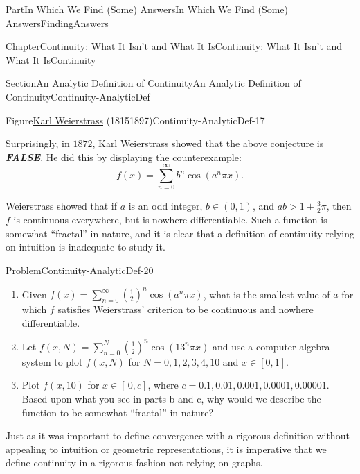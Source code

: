 \documentclass[oneside,10pt,]{book}
\newcommand{\alert}[1]{\textbf{\textit{#1}}}
\numberwithin{equation}{part}
\begin{document}
\begin{partptx}{Part}{In Which We Find (Some) Answers}{}{In Which We Find (Some) Answers}{}{}{FindingAnswers}
\begin{chapterptx}{Chapter}{Continuity: What It Isn't and What It Is}{}{Continuity: What It Isn't and What It Is}{}{}{Continuity}
\begin{sectionptx}{Section}{An Analytic Definition of Continuity}{}{An Analytic Definition of Continuity}{}{}{Continuity-AnalyticDef}
\begin{figureptx}{Figure}{\href{https://mathshistory.st-andrews.ac.uk/Biographies/Weierstrass/}{Karl Weierstrass}\protect\footnotemark{} (1815\textendash{}1897)}{Continuity-AnalyticDef-17}{}
\begin{image}{0.325}{0.35}{0.325}{}
\end{image}%
\tcblower
\end{figureptx}%
%
Surprisingly, in \(1872\), Karl Weierstrass  showed that the above conjecture is \alert{FALSE}. He did this by displaying the counterexample:%
\begin{equation*}
f(x)=\sum_{n=0}^\infty b^n\cos(a^n\pi x)\text{.}
\end{equation*}
%
\par
Weierstrass showed that if \(a\) is an odd integer, \(b\in(0,1)\), and \(ab>1+\frac{3}{2}\pi\), then \(f\) is continuous everywhere, but is nowhere differentiable.  Such a function is somewhat ``fractal'' in nature, and it is clear that a definition of continuity relying on intuition is inadequate to study it.%
\begin{problem}{Problem}{}{Continuity-AnalyticDef-20}%
\begin{enumerate}[font=\bfseries,label=(\alph*),ref=\alph*]%
\item{}Given \(f(x)=\sum_{n=0}^\infty\left(\frac{1}{2}\right)^n\cos\left(a^n\pi
x\right)\), what is the smallest value of \(a\) for which \(f\) satisfies Weierstrass' criterion to be continuous and nowhere differentiable.%
\item{}Let \(f(x,N)=\sum_{n=0}^N\left(\frac{1}{2}\right)^n\cos\left(13^n\pi
x\right)\) and use a computer algebra system to plot \(f(x,N)\) for \(N=0,1,2,3,4,10\) and \(x\in[0,1]\).%
\item{}Plot \(f(x,10)\) for \(x\in[\,0,c]\), where \(c=0.1,0.01,0.001,0.0001,0.00001\).  Based upon what you see in parts b and c, why would we describe the function to be somewhat ``fractal'' in nature?%
\end{enumerate}%
\end{problem}
Just as it was important to define convergence with a rigorous definition without appealing to intuition or geometric representations, it is imperative that we define continuity in a rigorous fashion not relying on graphs.%
\par

\end{sectionptx}
\end{chapterptx}
\end{partptx}
\end{document}
